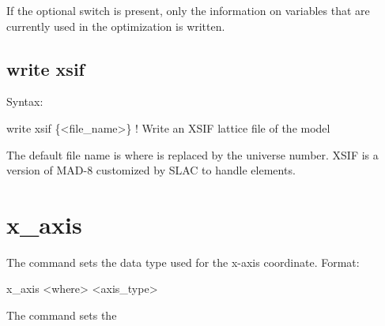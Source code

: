 {{{{{{{{{{{If the optional  switch is present, only the information on variables that are
currently used in the optimization is written.


\subsection{write xsif}
\label{s:write.xsif}

Syntax:
\begin{example}
    write xsif \{<file_name>\}  ! Write an XSIF lattice file of the model
\end{example}

The default file name is  where \vn{\#} is replaced by the universe number. XSIF is
a version of MAD-8 customized by SLAC to handle  elements.


\section{x_axis}
\label{s:x.axis}

The  command sets the data type used for the x-axis coordinate. Format:
\begin{example}
  x_axis <where> <axis_type>
\end{example}

\vskip 7pt 

The  command sets the \vn{plot%
for the horizontal axis. Possibilities for \vn{<axis_type>} are:
\begin{example}
  index     -- Use data index
  ele_index -- Use data element index
  s         -- Use longitudinal position.
\end{example}
Note that \vn{index} only makes sense for data that has an index associated with it.

Examples:
\begin{example}
  x_axis * s
  x_axis top index
\end{example}

\section{x_scale}\index{commands!x_scale}
\label{s:x.scale}

}}}}}}}}}}}}

